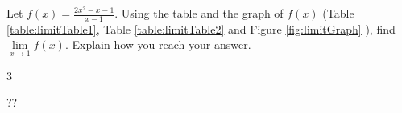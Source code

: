 \begin{example} \label{ex1}
Let $f(x)=\displaystyle \frac{2x^2-x-1}{x-1}$. Using the table and the graph of $f(x)$ (Table  \ref{table:limitTable1}, Table  \ref{table:limitTable2}  and Figure  \ref{fig:limitGraph} ), find \(\lim\limits_{x \to 1} f(x)\). Explain how you reach your answer.
    \begin{sol}
    3
    \end{sol}
    \begin{solL}
    ??
    
    \end{solL}
    
\end{example}
\begin{comment}
\begin{figure}[h]
\texttt{[image: limits/limitTable]}
\caption{}
\label{fig:limitTable}
\end{figure}
\end{comment}

